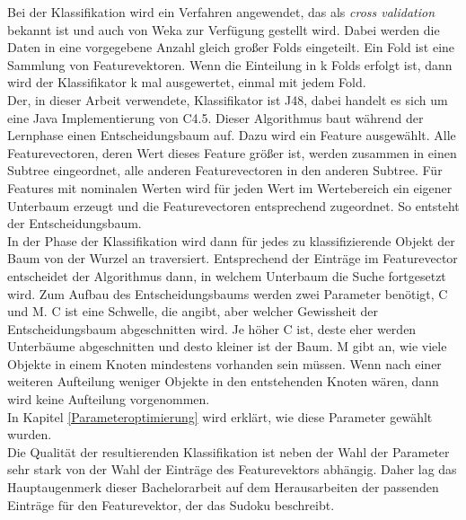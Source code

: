 Bei der Klassifikation wird ein Verfahren angewendet, das als \textit{cross validation} bekannt ist und auch von Weka zur Verfügung gestellt wird. Dabei werden die Daten in eine vorgegebene Anzahl gleich großer Folds eingeteilt. Ein Fold ist eine Sammlung von Featurevektoren. Wenn die Einteilung in k Folds erfolgt ist, dann wird der Klassifikator k mal ausgewertet, einmal mit jedem Fold.\\
Der, in dieser Arbeit verwendete, Klassifikator ist J48, dabei handelt es sich um eine Java Implementierung von C4.5.  Dieser Algorithmus baut während der Lernphase einen Entscheidungsbaum auf. Dazu wird ein Feature ausgewählt. Alle Featurevectoren, deren Wert dieses Feature größer ist, werden zusammen in einen Subtree eingeordnet, alle anderen Featurevectoren in den anderen Subtree. Für Features mit nominalen Werten wird für jeden Wert im Wertebereich ein eigener Unterbaum erzeugt und die Featurevectoren entsprechend zugeordnet. So entsteht der Entscheidungsbaum.\\
In der Phase der Klassifikation wird dann für jedes zu klassifizierende Objekt der Baum von der Wurzel an traversiert. Entsprechend der Einträge im Featurevector entscheidet der Algorithmus dann, in welchem Unterbaum die Suche fortgesetzt wird. Zum Aufbau des Entscheidungsbaums werden zwei Parameter benötigt, C und M. C ist eine Schwelle, die angibt, aber welcher Gewissheit der Entscheidungsbaum abgeschnitten wird. Je höher C ist, deste eher werden Unterbäume abgeschnitten und desto kleiner ist der Baum. M gibt an, wie viele Objekte in einem Knoten mindestens vorhanden sein müssen. Wenn nach einer weiteren Aufteilung weniger Objekte in den entstehenden Knoten wären, dann wird keine Aufteilung vorgenommen.\cite{Witten2011}\\
 In Kapitel \ref{Parameteroptimierung} wird erklärt, wie diese Parameter gewählt wurden.\\
Die Qualität der resultierenden Klassifikation ist neben der Wahl der Parameter sehr stark von der Wahl der Einträge des Featurevektors abhängig. Daher lag das Hauptaugenmerk dieser Bachelorarbeit auf dem Herausarbeiten der passenden Einträge für den Featurevektor, der das Sudoku beschreibt.\\